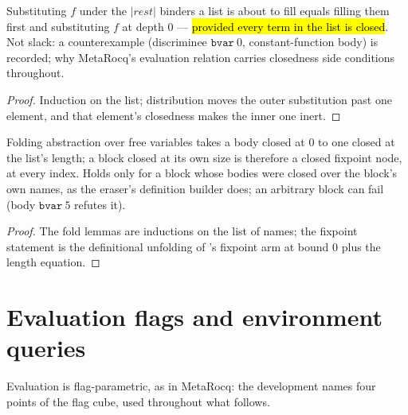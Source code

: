 \begin{lemma}
\label{lem:LBTerm-substList_reverse_subst}
\leanok
{}
 Substituting $f$ under the $|rest|$ binders a list is about to fill equals filling them first and substituting $f$ at depth $0$ --- \hl{provided every term in the list is closed}.
 Not slack: a counterexample (discriminee $\mathtt{bvar}\ 0$, constant-function body) is recorded; why MetaRocq's evaluation relation carries closedness side conditions throughout.
\end{lemma}
\begin{proof}
\leanok
{}
 Induction on the list; distribution moves the outer substitution past one element, and that element's closedness makes the inner one inert.
\end{proof}

\begin{lemma}
\label{lem:lbClosed_fix_of_bodies}
\leanok
{}
 Folding abstraction over free variables takes a body closed at $0$ to one closed at the list's length; a block closed at its own size is therefore a closed fixpoint node, at every index.
 Holds only for a block whose bodies were closed over the block's own names, as the eraser's definition builder does; an arbitrary block can fail (body $\mathtt{bvar}\ 5$ refutes it).
\end{lemma}
\begin{proof}
\leanok
{}
 The fold lemmas are inductions on the list of names; the fixpoint statement is the definitional unfolding of 's fixpoint arm at bound $0$ plus the length equation.
\end{proof}

\section{Evaluation flags and environment queries}
\label{sec:lambdabox:flags}

Evaluation is flag-parametric, as in MetaRocq: the development names four points of the flag cube, used throughout what follows.

